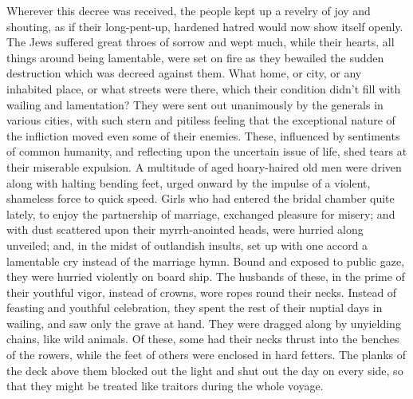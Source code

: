  Wherever this decree was received, the people kept up a
revelry of joy and shouting, as if their long-pent-up, hardened hatred
would now show itself openly.  The Jews suffered great
throes of sorrow and wept much, while their hearts, all things around
being lamentable, were set on fire as they bewailed the sudden
destruction which was decreed against them.  What home, or
city, or any inhabited place, or what streets were there, which their
condition didn't fill with wailing and lamentation?  They
were sent out unanimously by the generals in various cities, with such
stern and pitiless feeling that the exceptional nature of the infliction
moved even some of their enemies. These, influenced by sentiments of
common humanity, and reflecting upon the uncertain issue of life, shed
tears at their miserable expulsion.  A multitude of aged
hoary-haired old men were driven along with halting bending feet, urged
onward by the impulse of a violent, shameless force to quick speed.
 Girls who had entered the bridal chamber quite lately, to
enjoy the partnership of marriage, exchanged pleasure for misery; and
with dust scattered upon their myrrh-anointed heads, were hurried along
unveiled; and, in the midst of outlandish insults, set up with one
accord a lamentable cry instead of the marriage hymn. 
Bound and exposed to public gaze, they were hurried violently on board
ship.  The husbands of these, in the prime of their
youthful vigor, instead of crowns, wore ropes round their necks. Instead
of feasting and youthful celebration, they spent the rest of their
nuptial days in wailing, and saw only the grave at hand. 
They were dragged along by unyielding chains, like wild animals. Of
these, some had their necks thrust into the benches of the rowers, while
the feet of others were enclosed in hard fetters.  The
planks of the deck above them blocked out the light and shut out the day
on every side, so that they might be treated like traitors during the
whole voyage.

